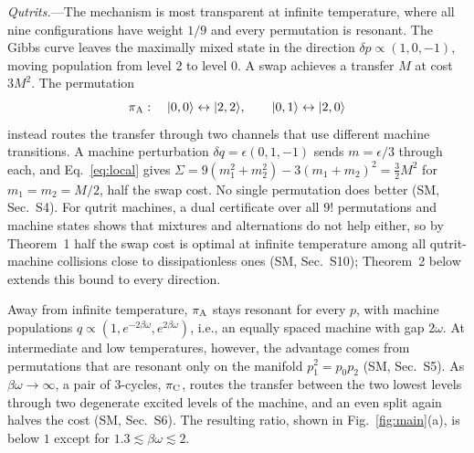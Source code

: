 \documentclass[aps,prl,reprint,superscriptaddress,amsmath,amssymb]{revtex4-2}
\begin{document}
\emph{Qutrits.}---The mechanism is most transparent at infinite temperature, where all nine configurations have
weight $1/9$ and every permutation is resonant. The Gibbs curve leaves the maximally mixed state in the direction
$\delta p\propto(1,0,-1)$, moving population from level $2$ to level $0$. A swap achieves a transfer $M$ at cost $3M^2$.
The permutation
\begin{equation}
\pi_{\rm A}:\quad |0,0\rangle\leftrightarrow|2,2\rangle,\qquad |0,1\rangle\leftrightarrow|2,0\rangle
\label{eq:piA}
\end{equation}
instead routes the transfer through two channels that use different machine transitions. A machine perturbation
$\delta q=\epsilon(0,1,-1)$ sends $m=\epsilon/3$ through each, and Eq.~\eqref{eq:local} gives
$\Sigma=9(m_1^2+m_2^2)-3(m_1+m_2)^2=\tfrac32 M^2$ for $m_1=m_2=M/2$, half the swap cost. No single permutation does
better (SM, Sec.~S4). For qutrit machines, a dual certificate over all $9!$ permutations and machine states shows that
mixtures and alternations do not help either, so by Theorem~1 half the swap cost is optimal at infinite temperature
among all qutrit-machine collisions close to dissipationless ones (SM, Sec.~S10); Theorem~2 below extends this bound to
every direction.

Away from infinite temperature, $\pi_{\rm A}$ stays resonant for every $p$, with machine populations
$q\propto(1,e^{-2\beta\omega},e^{2\beta\omega})$, i.e., an equally spaced machine with gap $2\omega$. At intermediate and
low temperatures, however, the advantage comes from permutations that are resonant only on the manifold $p_1^2=p_0p_2$
(SM, Sec.~S5). As $\beta\omega\to\infty$, a pair of $3$-cycles, $\pi_{\rm C}$, routes the transfer between the two lowest
levels through two degenerate excited levels of the machine, and an even split again halves the cost (SM, Sec.~S6).
The resulting ratio, shown in Fig.~\ref{fig:main}(a), is below $1$ except for $1.3\lesssim\beta\omega\lesssim2$.
\end{document}
